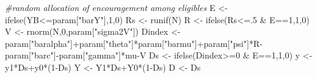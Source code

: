 \documentclass[
]{book}
\newenvironment{Shaded}{\begin{snugshade}}{\end{snugshade}}
\newcommand{\CommentTok}[1]{\textcolor[rgb]{0.56,0.35,0.01}{\textit{#1}}}
\newcommand{\DecValTok}[1]{\textcolor[rgb]{0.00,0.00,0.81}{#1}}
\newcommand{\FunctionTok}[1]{\textcolor[rgb]{0.00,0.00,0.00}{#1}}
\newcommand{\NormalTok}[1]{#1}
\newcommand{\OtherTok}[1]{\textcolor[rgb]{0.56,0.35,0.01}{#1}}
\newcommand{\SpecialCharTok}[1]{\textcolor[rgb]{0.00,0.00,0.00}{#1}}
\newcommand{\StringTok}[1]{\textcolor[rgb]{0.31,0.60,0.02}{#1}}
\theoremstyle{definition}
\theoremstyle{definition}
\theoremstyle{definition}
\theoremstyle{definition}
\theoremstyle{remark}
\begin{document}
\begin{Shaded}
\begin{Highlighting}[]
\CommentTok{\#random allocation of encouragement among eligibles}
\NormalTok{E }\OtherTok{\textless{}{-}} \FunctionTok{ifelse}\NormalTok{(YB}\SpecialCharTok{\textless{}=}\NormalTok{param[}\StringTok{"barY"}\NormalTok{],}\DecValTok{1}\NormalTok{,}\DecValTok{0}\NormalTok{)}
\NormalTok{Rs }\OtherTok{\textless{}{-}} \FunctionTok{runif}\NormalTok{(N)}
\NormalTok{R }\OtherTok{\textless{}{-}} \FunctionTok{ifelse}\NormalTok{(Rs}\SpecialCharTok{\textless{}=}\NormalTok{.}\DecValTok{5} \SpecialCharTok{\&}\NormalTok{ E}\SpecialCharTok{==}\DecValTok{1}\NormalTok{,}\DecValTok{1}\NormalTok{,}\DecValTok{0}\NormalTok{)}
\NormalTok{V }\OtherTok{\textless{}{-}} \FunctionTok{rnorm}\NormalTok{(N,}\DecValTok{0}\NormalTok{,param[}\StringTok{"sigma2V"}\NormalTok{])}
\NormalTok{Dindex }\OtherTok{\textless{}{-}}\NormalTok{ param[}\StringTok{"baralpha"}\NormalTok{]}\SpecialCharTok{+}\NormalTok{param[}\StringTok{"theta"}\NormalTok{]}\SpecialCharTok{*}\NormalTok{param[}\StringTok{"barmu"}\NormalTok{]}\SpecialCharTok{+}\NormalTok{param[}\StringTok{"psi"}\NormalTok{]}\SpecialCharTok{*}\NormalTok{R}\SpecialCharTok{{-}}\NormalTok{param[}\StringTok{"barc"}\NormalTok{]}\SpecialCharTok{{-}}\NormalTok{param[}\StringTok{"gamma"}\NormalTok{]}\SpecialCharTok{*}\NormalTok{mu}\SpecialCharTok{{-}}\NormalTok{V}
\NormalTok{Ds }\OtherTok{\textless{}{-}} \FunctionTok{ifelse}\NormalTok{(Dindex}\SpecialCharTok{\textgreater{}=}\DecValTok{0} \SpecialCharTok{\&}\NormalTok{ E}\SpecialCharTok{==}\DecValTok{1}\NormalTok{,}\DecValTok{1}\NormalTok{,}\DecValTok{0}\NormalTok{)}
\NormalTok{y }\OtherTok{\textless{}{-}}\NormalTok{ y1}\SpecialCharTok{*}\NormalTok{Ds}\SpecialCharTok{+}\NormalTok{y0}\SpecialCharTok{*}\NormalTok{(}\DecValTok{1}\SpecialCharTok{{-}}\NormalTok{Ds)}
\NormalTok{Y }\OtherTok{\textless{}{-}}\NormalTok{ Y1}\SpecialCharTok{*}\NormalTok{Ds}\SpecialCharTok{+}\NormalTok{Y0}\SpecialCharTok{*}\NormalTok{(}\DecValTok{1}\SpecialCharTok{{-}}\NormalTok{Ds)}
\NormalTok{D }\OtherTok{\textless{}{-}}\NormalTok{ Ds}


\end{Highlighting}
\end{Shaded}
\end{document}
